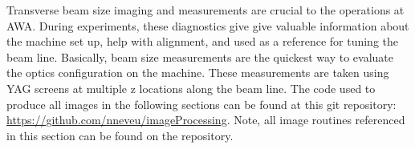  \label{sec:beamsize}

Transverse beam size imaging and measurements are crucial to the 
operations at AWA. During experiments, these diagnostics give 
give valuable information about the machine set up, help with alignment, 
and used as a reference for tuning the beam line.
Basically, beam size measurements are the quickest way to evaluate the
optics configuration on the machine. 
These measurements are taken using YAG screens at multiple z locations along the beam line.
The code used to produce all images in the following sections can be found at this git repository: 
\url{https://github.com/nneveu/imageProcessing}.
Note, all image routines referenced in this section can be found on the repository.

